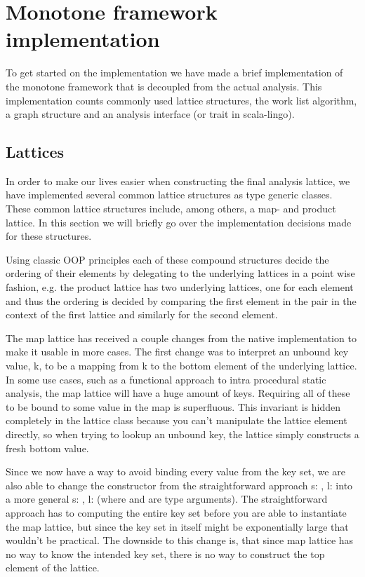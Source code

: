 \chapter{Monotone framework implementation}

To get started on the implementation we have made a brief implementation of the monotone framework that is decoupled from the actual analysis.
This implementation counts commonly used lattice structures, the work list algorithm, a graph structure and an analysis interface (or trait in scala-lingo).

\section{Lattices}

In order to make our lives easier when constructing the final analysis lattice, we have implemented several common lattice structures as type generic classes. 
These common lattice structures include, among others, a map- and product lattice. 
In this section we will briefly go over the implementation decisions made for these structures.

Using classic OOP principles each of these compound structures decide the ordering of their elements by delegating to the underlying lattices in a point wise fashion, 
e.g. the product lattice has two underlying lattices, 
one for each element and thus the ordering is decided by comparing the first element in the pair in the context of the first lattice and similarly for the second element.

The map lattice has received a couple changes from the native implementation to make it usable in more cases. 
The first change was to interpret an unbound key value, k, to be a mapping from k to the bottom element of the underlying lattice. 
In some use cases, such as a functional approach to intra procedural static analysis, the map lattice will have a huge amount of keys. 
Requiring all of these to be bound to some value in the map is superfluous. 
This invariant is hidden completely in the lattice class because you can't manipulate the lattice element directly, 
so when trying to lookup an unbound key, the lattice simply constructs a fresh bottom value.

Since we now have a way to avoid binding every value from the key set, we are also able to change the constructor 
from the straightforward approach s: , l:  into a more general s: , l:  
(where  and  are type arguments). The straightforward approach has to computing the entire key set before you are able to 
instantiate the map lattice, but since the key set in itself might be exponentially large that wouldn't be practical. The downside to this change is, 
that since map lattice has no way to know the intended key set, there is no way to construct the top element of the lattice.

